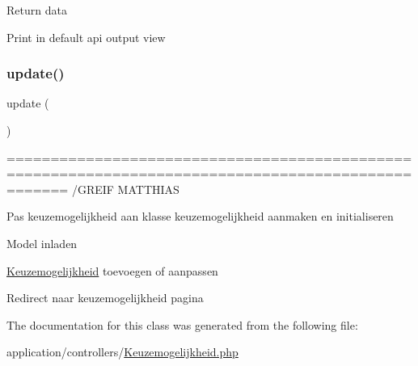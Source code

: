 Return data

Print in default api output view \mbox{\label{class_keuzemogelijkheid_a842e4774e3b3601a005b995c02f7e883}} 
\subsubsection{\texorpdfstring{update()}{update()}}
{\footnotesize\ttfamily update (\begin{DoxyParamCaption}{ }\end{DoxyParamCaption})}



=================================================================================================== /\+G\+R\+E\+IF M\+A\+T\+T\+H\+I\+AS 

Pas keuzemogelijkheid aan klasse keuzemogelijkheid aanmaken en initialiseren

Model inladen

\mbox{\hyperlink{class_keuzemogelijkheid}{Keuzemogelijkheid}} toevoegen of aanpassen

Redirect naar keuzemogelijkheid pagina 

The documentation for this class was generated from the following file\+:\begin{DoxyCompactItemize}
\item 
application/controllers/\mbox{\hyperlink{_keuzemogelijkheid_8php}{Keuzemogelijkheid.\+php}}\end{DoxyCompactItemize}
